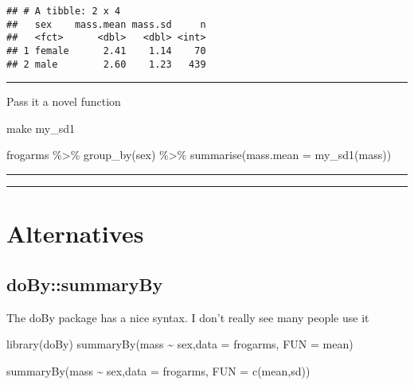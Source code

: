 \documentclass[
]{book}
\newenvironment{Shaded}{\begin{snugshade}}{\end{snugshade}}
\newcommand{\AttributeTok}[1]{\textcolor[rgb]{0.77,0.63,0.00}{#1}}
\newcommand{\FunctionTok}[1]{\textcolor[rgb]{0.00,0.00,0.00}{#1}}
\newcommand{\NormalTok}[1]{#1}
\newcommand{\SpecialCharTok}[1]{\textcolor[rgb]{0.00,0.00,0.00}{#1}}
\begin{document}
\begin{verbatim}
## # A tibble: 2 x 4
##   sex    mass.mean mass.sd     n
##   <fct>      <dbl>   <dbl> <int>
## 1 female      2.41    1.14    70
## 2 male        2.60    1.23   439
\end{verbatim}

\begin{center}\rule{0.5\linewidth}{0.5pt}\end{center}

Pass it a novel function

make my\_sd1

\begin{Shaded}
\begin{Highlighting}[]
\NormalTok{frogarms }\SpecialCharTok{\%\textgreater{}\%} 
  \FunctionTok{group\_by}\NormalTok{(sex) }\SpecialCharTok{\%\textgreater{}\%}
  \FunctionTok{summarise}\NormalTok{(}\AttributeTok{mass.mean =}  \FunctionTok{my\_sd1}\NormalTok{(mass))}
\end{Highlighting}
\end{Shaded}

\begin{center}\rule{0.5\linewidth}{0.5pt}\end{center}

\begin{center}\rule{0.5\linewidth}{0.5pt}\end{center}

\hypertarget{alternatives}{%
\section{Alternatives}\label{alternatives}}

\hypertarget{dobysummaryby}{%
\subsection{doBy::summaryBy}\label{dobysummaryby}}

The doBy package has a nice syntax. I don't really see many people use it

\begin{Shaded}
\begin{Highlighting}[]
\FunctionTok{library}\NormalTok{(doBy)}
\FunctionTok{summaryBy}\NormalTok{(mass }\SpecialCharTok{\textasciitilde{}}\NormalTok{ sex,}\AttributeTok{data =}\NormalTok{ frogarms, }\AttributeTok{FUN =}\NormalTok{ mean)}

\FunctionTok{summaryBy}\NormalTok{(mass }\SpecialCharTok{\textasciitilde{}}\NormalTok{ sex,}\AttributeTok{data =}\NormalTok{ frogarms, }\AttributeTok{FUN =} \FunctionTok{c}\NormalTok{(mean,sd))}
\end{Highlighting}
\end{Shaded}
\end{document}
